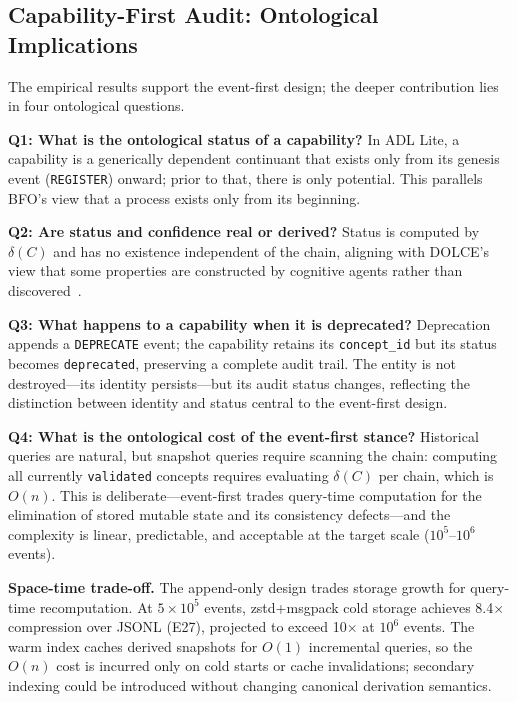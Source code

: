 
\subsection{Capability-First Audit: Ontological Implications}\label{subsec:ontological-implications}

The empirical results support the event-first design; the deeper contribution lies in four ontological questions.

\textbf{Q1: What is the ontological status of a capability?} In ADL Lite, a capability is a generically dependent continuant that exists only from its genesis event (\texttt{REGISTER}) onward; prior to that, there is only potential. This parallels BFO's view that a process exists only from its beginning.

\textbf{Q2: Are status and confidence real or derived?} Status is computed by $\delta(C)$ and has no existence independent of the chain, aligning with DOLCE's view that some properties are constructed by cognitive agents rather than discovered~\cite{dolce}.

\textbf{Q3: What happens to a capability when it is deprecated?} Deprecation appends a \texttt{DEPRECATE} event; the capability retains its \texttt{concept\_id} but its status becomes \texttt{deprecated}, preserving a complete audit trail. The entity is not destroyed---its identity persists---but its audit status changes, reflecting the distinction between identity and status central to the event-first design.

\textbf{Q4: What is the ontological cost of the event-first stance?} Historical queries are natural, but snapshot queries require scanning the chain: computing all currently \texttt{validated} concepts requires evaluating $\delta(C)$ per chain, which is $O(n)$. This is deliberate---event-first trades query-time computation for the elimination of stored mutable state and its consistency defects---and the complexity is linear, predictable, and acceptable at the target scale ($10^5$--$10^6$ events).

\textbf{Space-time trade-off.} The append-only design trades storage growth for query-time recomputation. At $5\times10^5$ events, zstd+msgpack cold storage achieves 8.4$\times$ compression over JSONL (E27), projected to exceed 10$\times$ at $10^6$ events. The warm index caches derived snapshots for $O(1)$ incremental queries, so the $O(n)$ cost is incurred only on cold starts or cache invalidations; secondary indexing could be introduced without changing canonical derivation semantics.

